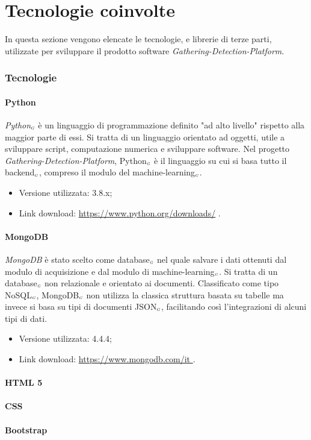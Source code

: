 \chapter{Tecnologie coinvolte}\label{TecnologieCoinvolte}
In questa sezione vengono elencate le tecnologie, e librerie di terze parti, utilizzate per sviluppare il prodotto software \textit{Gathering-Detection-Platform}.

\subsection{Tecnologie}\label{Tecnologie}
\subsubsection{Python}\label{TecnologiePython}
\textit{Python$_{\scaleto{G}{3pt}}$} è un linguaggio di programmazione definito "ad alto livello" rispetto alla maggior parte di essi.
Si tratta di un linguaggio orientato ad oggetti, utile a sviluppare script, computazione numerica e sviluppare software.
Nel progetto \textit{Gathering-Detection-Platform}, Python$_{\scaleto{G}{3pt}}$ è il linguaggio su cui si basa tutto il backend$_{\scaleto{G}{3pt}}$, compreso il modulo del machine-learning$_{\scaleto{G}{3pt}}$.

\begin{itemize}
  \item Versione utilizzata: 3.8.x;
  \item Link download: \url{https://www.python.org/downloads/} .
\end{itemize}

\subsubsection{MongoDB}\label{TecnologieMongoDB}
\textit{MongoDB} è stato scelto come database$_{\scaleto{G}{3pt}}$ nel quale salvare i dati ottenuti dal modulo di acquisizione e dal modulo di machine-learning$_{\scaleto{G}{3pt}}$.
Si tratta di un database$_{\scaleto{G}{3pt}}$ non relazionale e orientato ai documenti.
Classificato come tipo NoSQL$_{\scaleto{G}{3pt}}$, MongoDB$_{\scaleto{G}{3pt}}$ non utilizza la classica struttura basata su tabelle ma invece si basa su tipi di documenti JSON$_{\scaleto{G}{3pt}}$, facilitando così l'integrazioni di alcuni tipi di dati.

\begin{itemize}
    \item Versione utilizzata: 4.4.4;
    \item Link download: \url{https://www.mongodb.com/it }.
\end{itemize}


\subsubsection{HTML 5}\label{TecnologieHTML}

\subsubsection{CSS}\label{TecnologieCSS}

\subsubsection{Bootstrap}\label{TecnologieBootstrap}
